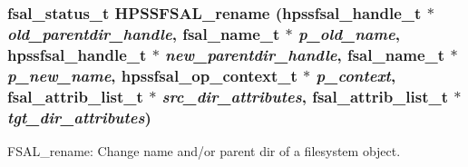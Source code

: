 \subsubsection[{HPSSFSAL\_\-rename}]{\setlength{\rightskip}{0pt plus 5cm}fsal\_\-status\_\-t HPSSFSAL\_\-rename (hpssfsal\_\-handle\_\-t $\ast$ {\em old\_\-parentdir\_\-handle}, \/  fsal\_\-name\_\-t $\ast$ {\em p\_\-old\_\-name}, \/  hpssfsal\_\-handle\_\-t $\ast$ {\em new\_\-parentdir\_\-handle}, \/  fsal\_\-name\_\-t $\ast$ {\em p\_\-new\_\-name}, \/  hpssfsal\_\-op\_\-context\_\-t $\ast$ {\em p\_\-context}, \/  fsal\_\-attrib\_\-list\_\-t $\ast$ {\em src\_\-dir\_\-attributes}, \/  fsal\_\-attrib\_\-list\_\-t $\ast$ {\em tgt\_\-dir\_\-attributes})}\label{fsal__rename_8c_a5df5f9b4bb1f75eff681d69cc2e859cf}
FSAL\_\-rename: Change name and/or parent dir of a filesystem object.



